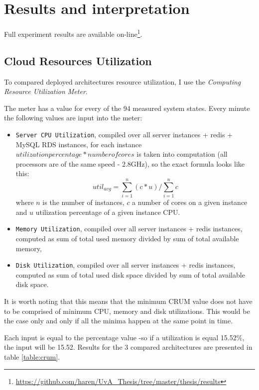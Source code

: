 \documentclass{uvamscse}
\begin{document}
\section{Results and interpretation}

Full experiment results are available on-line\footnote{\url{https://github.com/haren/UvA_Thesis/tree/master/thesis/results}}.

\subsection{Cloud Resources Utilization}
To compared deployed architectures resource utilization, I use the \textit{Computing Resource Utilization Meter}.

The meter has a value for every of the 94 measured system states. Every minute the following values are input into the meter:
\begin{itemize}
  \item \texttt{Server CPU Utilization}, compiled over all server instances + redis + MySQL RDS instances, for each instance $utilization percentage * number of cores$ is taken into computation (all processors are of the same speed - 2.8GHz), so the exact formula looks like this: $$util_{avg} = \sum_{i=1}^{n}(c*u) / \sum_{i=1}^{n}c$$ where $n$ is the number of instances, $c$ a number of cores on a given instance and $u$ utilization percentage of a given instance CPU.
  \item \texttt{Memory Utilization}, compiled over all server instances + redis instances, computed as sum of total used memory divided by sum of total available memory,
  \item \texttt{Disk Utilization}, compiled over all server instances + redis instances, computed as sum of total used disk space divided by sum of total available disk space.
\end{itemize}

It is worth noting that this means that the minimum CRUM value does not have to be comprised of minimum CPU, memory and disk utilizations. This would be the case only and only if all the minima happen at the same point in time.

Each input is equal to the percentage value -so if a utilization is equal 15.52\%, the input will be 15.52. Results for the 3 compared architectures are presented in table \ref{table:crum}.
\end{document}
